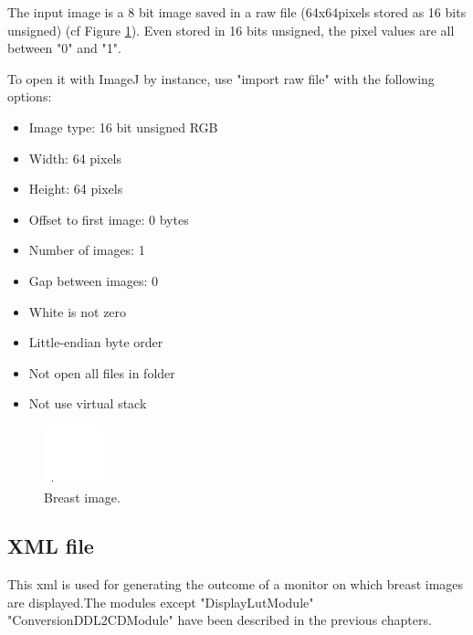 The input image is a 8 bit image saved in a raw file (64x64pixels stored as 16 bits unsigned) (cf Figure \ref{fig:breast}). Even stored in 16 bits unsigned, the pixel values are all between "0" and "1".

To open it with ImageJ by instance, use "import raw file" with the following options:
\begin{itemize}
\item Image type: 16 bit unsigned RGB
\item Width: 64 pixels
\item Height: 64 pixels
\item Offset to first image: 0 bytes
\item Number of images: 1
\item Gap between images: 0
\item White is not zero
\item Little-endian byte order
\item Not open all files in folder
\item Not use virtual stack
\end{itemize}

\begin{figure}[!htb]
\begin{center}
\includegraphics[width=0.25\columnwidth]{./05_ClinicalStudy/images/breast.png}
\caption{Breast image.}\label{fig:breast}
\end{center}
\end{figure}

\subsection{XML file}

This xml is used for generating the outcome of a monitor on which breast images are displayed.The modules except "DisplayLutModule" "ConversionDDL2CDModule" have been described in the previous chapters.

